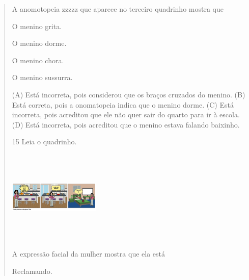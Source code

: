 \begin{verse}

A anomotopeia zzzzz que aparece no terceiro quadrinho mostra que

\begin{minipage}{.5\textwidth}
\begin{escolha}
\item O menino grita.

\item O menino dorme.

\item O menino chora.

\item O menino sussurra.
\end{escolha}
\end{minipage}

(A) Está incorreta, pois considerou que os braços cruzados do menino.
(B) Está correta, pois a onomatopeia indica que o menino dorme.
(C) Está incorreta, pois acreditou que ele não quer sair do quarto para ir à escola.
(D) Está incorreta, pois acreditou que o menino estava falando baixinho.

\num{15} Leia o quadrinho.

\includegraphics[width=1.70556in,height=1.74444in]{media/image146.png}


A expressão facial da mulher mostra que ela está

\begin{minipage}{.5\textwidth}
\begin{escolha}
\item Reclamando.


\end{escolha}
\end{minipage}
\end{verse}
